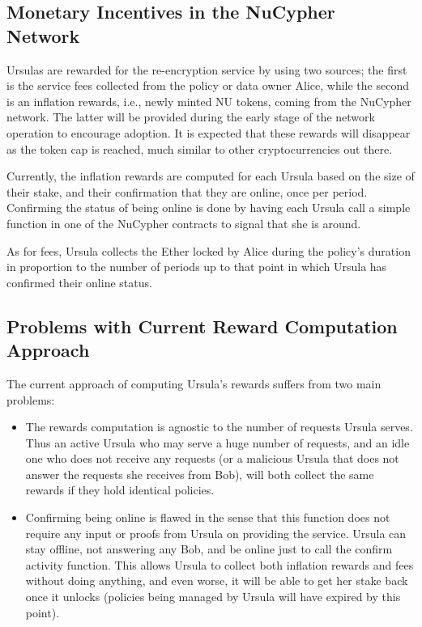 \subsection{Monetary Incentives in the NuCypher Network}
Ursulas are rewarded for the re-encryption service by using two sources; 
the first is the service fees collected from the policy or data 
owner Alice, while the second is an inflation rewards, i.e., newly minted 
NU tokens, coming from the NuCypher network. The latter will be provided during the 
early stage of the network operation to encourage 
adoption. It is expected that these rewards will disappear as the token cap is 
reached, much similar to other cryptocurrencies out there.


Currently, the inflation rewards are computed for each Ursula based on the size of their stake, and their confirmation that they are online, once per period. Confirming the status of being online is done by having each Ursula call a 
simple function in one of the NuCypher contracts to signal that she is around. 

As for fees, Ursula collects the Ether locked by Alice during the policy's duration in proportion to the number of periods up to that point in which Ursula has confirmed their online status. 


\subsection{Problems with Current Reward Computation Approach}
The current approach of computing Ursula's rewards suffers from two 
main problems: 
\begin{itemize}
\setlength{\itemsep}{0pt}
\item The rewards computation is agnostic to the number of 
requests Ursula serves. Thus an active Ursula who may serve a huge number of 
requests, and an idle one who does not receive any requests (or a 
malicious Ursula that does not answer the requests she receives from Bob), will 
both collect the same rewards if they hold identical policies.
\item Confirming being online is flawed in the sense that this function does 
not require any input or proofs from Ursula on providing the service. Ursula 
can stay offline, not answering any Bob, and be online just to call the confirm activity 
function. This allows Ursula to collect both inflation rewards 
and fees without doing anything, and even worse, it will be able to get her stake back once it unlocks (policies being managed by Ursula will have expired by this point). 
\end{itemize}



